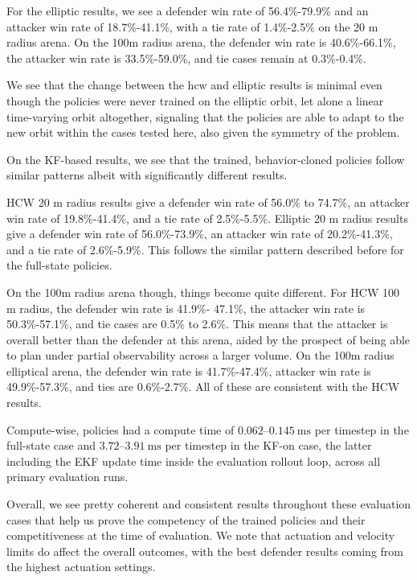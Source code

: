 For the elliptic results, we see a defender win rate of 56.4\%-79.9\% and an attacker win rate of 18.7\%-41.1\%, with a tie rate of 1.4\%-2.5\% on the 20 m radius arena. On the 100m radius arena, the defender win rate is 40.6\%-66.1\%, the attacker win rate is 33.5\%-59.0\%, and tie cases remain at 0.3\%-0.4\%.


We see that the change between the \acs{hcw} and elliptic results is minimal even though the policies were never trained on the elliptic orbit, let alone a linear time-varying orbit altogether, signaling that the policies are able to adapt to the new orbit within the cases tested here, also given the symmetry of the problem.

On the KF-based results, we see that the trained, behavior-cloned policies follow similar patterns albeit with significantly different results.

HCW 20 m radius results give a defender win rate of 56.0\% to 74.7\%, an attacker win rate of 19.8\%-41.4\%, and a tie rate of 2.5\%-5.5\%. Elliptic 20 m radius results give a defender win rate of 56.0\%-73.9\%, an attacker win rate of 20.2\%-41.3\%, and a tie rate of 2.6\%-5.9\%. This follows the similar pattern described before for the full-state policies.

On the 100m radius arena though, things become quite different. For HCW 100 m radius, the defender win rate is 41.9\%- 47.1\%, the attacker win rate is  50.3\%-57.1\%, and tie cases are 0.5\% to 2.6\%. This means that the attacker is overall better than the defender at this arena, aided by the prospect of being able to plan under partial observability across a larger volume. On the 100m radius elliptical arena, the defender win rate is 41.7\%-47.4\%, attacker win rate is 49.9\%-57.3\%, and ties are 0.6\%-2.7\%. All of these are consistent with the HCW results.

Compute-wise, policies had a compute time of $0.062$--$0.145~\mathrm{ms}$ per timestep
in the full-state case and $3.72$--$3.91~\mathrm{ms}$ per timestep in the KF-on case, the latter including the EKF update time inside the evaluation rollout loop,
across all primary evaluation runs.

Overall, we see pretty coherent and consistent results throughout these evaluation cases that help us prove the competency of the trained policies and their competitiveness at the time of evaluation. We note that actuation and velocity limits do affect the overall outcomes, with the best defender results coming from the highest actuation settings.

